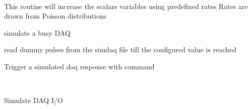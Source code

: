 \documentclass[letterpaper,10pt,english]{sphinxmanual}
\begin{document}
\begin{fulllineitems}
\label{muonic:muonic.daq.SimDaqConnection.SimDaq}~

\begin{fulllineitems}
\label{muonic:muonic.daq.SimDaqConnection.SimDaq._physics}
This routine will increase the scalars variables using predefined rates
Rates are drawn from Poisson distributions

\end{fulllineitems}


\begin{fulllineitems}
\label{muonic:muonic.daq.SimDaqConnection.SimDaq.inWaiting}
simulate a busy DAQ

\end{fulllineitems}


\begin{fulllineitems}
\label{muonic:muonic.daq.SimDaqConnection.SimDaq.readline}
read dummy pulses from the simdaq file till
the configured value is reached

\end{fulllineitems}


\begin{fulllineitems}
\label{muonic:muonic.daq.SimDaqConnection.SimDaq.write}
Trigger a simulated daq response with command

\end{fulllineitems}


\end{fulllineitems}


\begin{fulllineitems}
\label{muonic:muonic.daq.SimDaqConnection.SimDaqConnection}~

\begin{fulllineitems}
\label{muonic:muonic.daq.SimDaqConnection.SimDaqConnection.read}
Simulate DAQ I/O

\end{fulllineitems}


\end{fulllineitems}
\end{document}

